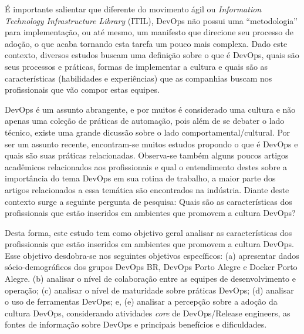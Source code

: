 \documentclass[twoside,english,brazilian]{UNISINOSartigo}
\begin{document}
É importante salientar que diferente do movimento ágil ou \textit{Information Technology Infrastructure Library} (ITIL), DevOps não possui uma ``metodologia'' para implementação, ou até mesmo, um manifesto que direcione seu processo de adoção, o que acaba tornando esta tarefa um pouco mais complexa. Dado este contexto, diversos estudos buscam uma definição sobre o que é DevOps, quais são seus processos e práticas, formas de implementar a cultura e quais são as características (habilidades e experiências) que as companhias buscam nos profissionais que vão compor estas equipes.

DevOps é um assunto abrangente, e por muitos é considerado uma cultura e não apenas uma coleção de práticas de automação, pois além de se debater o lado técnico, existe uma grande dicussão sobre o lado comportamental/cultural. Por ser um assunto recente, encontram-se muitos estudos propondo o que é DevOps e quais são suas práticas relacionadas. Observa-se também alguns poucos artigos acadêmicos relacionados aos profissionais e qual o entendimento destes sobre a importância do tema DevOps em sua rotina de trabalho, a maior parte dos artigos relacionados a essa temática são encontrados na indústria. Diante deste contexto surge a seguinte pergunta de pesquisa: Quais são as características dos profissionais que estão inseridos em ambientes que promovem a cultura DevOps?

Desta forma, este estudo tem como objetivo geral analisar as características dos profissionais que estão inseridos em ambientes que promovem a cultura DevOps. Esse objetivo desdobra-se nos seguintes objetivos específicos: (a) apresentar dados sócio-demográficos dos grupos DevOps BR, DevOps Porto Alegre e Docker Porto Alegre. (b) analisar o nível de colaboração entre as equipes de desenvolvimento e operação; (c) analisar o nível de maturidade sobre práticas DevOps; (d) analisar o uso de ferramentas DevOps; e, (e) analisar a percepção sobre a adoção da cultura DevOps, considerando atividades \textit{core} de DevOps/Release engineers, as fontes de informação sobre DevOps e principais benefícios e dificuldades.

\end{document}

